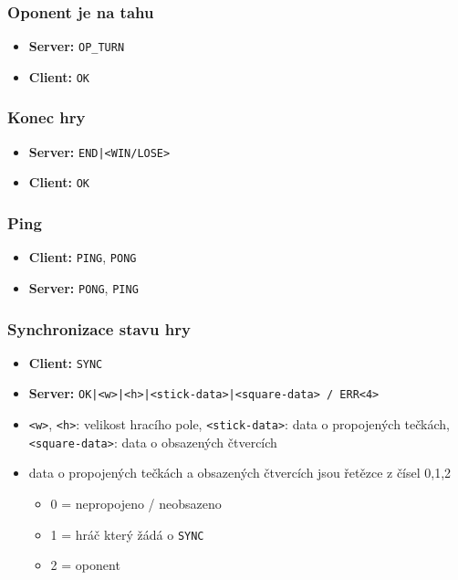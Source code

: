 \documentclass[11pt,a4paper]{article}
\begin{document}
\subsubsection*{Oponent je na tahu}
\begin{itemize}
	\item \textbf{Server:} \texttt{OP\_TURN}
	\item \textbf{Client:} \texttt{OK}
\end{itemize}

\subsubsection*{Konec hry}
\begin{itemize}
	\item \textbf{Server:} \texttt{END|<WIN/LOSE>}
	\item \textbf{Client:} \texttt{OK}
\end{itemize}

\subsubsection*{Ping}
\begin{itemize}
	\item \textbf{Client:} \texttt{PING}, \texttt{PONG}
	\item \textbf{Server:} \texttt{PONG}, \texttt{PING}
\end{itemize}

\subsubsection*{Synchronizace stavu hry}
\begin{itemize}
	\item \textbf{Client:} \texttt{SYNC}
	\item \textbf{Server:} \texttt{OK|<w>|<h>|<stick-data>|<square-data> / ERR<4>}
	\item \texttt{<w>}, \texttt{<h>}: velikost hracího pole, \texttt{<stick-data>}: data o propojených tečkách, \texttt{<square-data>}: data o obsazených čtvercích
	\item data o propojených tečkách a obsazených čtvercích jsou řetězce z čísel 0,1,2
	\begin{itemize}
		\item 0 = nepropojeno / neobsazeno
		\item 1 = hráč který žádá o \texttt{SYNC}
		\item 2 = oponent
	\end{itemize}
\end{itemize}
\end{document}
